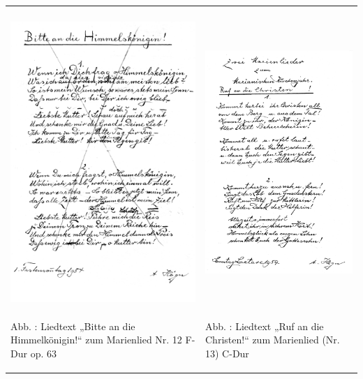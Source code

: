 \begin{flushleft}
\tablefirsthead{}
\tablehead{}
\tabletail{}
\tablelasttail{}
\begin{supertabular}{m{7.589cm}m{7.4040003cm}}

\includegraphics[width=7.408cm,height=10.964cm]{pictures/zulassungsarbeit-img069.png}

Abb. : Liedtext „Bitte an die Himmelkönigin!“
zum Marienlied Nr. 12 F-Dur op. 63 &

\includegraphics[width=7.223cm,height=10.964cm]{pictures/zulassungsarbeit-img070.png}

Abb. : Liedtext „Ruf an die Christen!“ zum
Marienlied (Nr. 13) C-Dur\\
\end{supertabular}
\end{flushleft}
